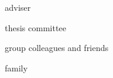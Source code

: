 \acknowledgments

adviser 

thesis committee

group colleagues and friends

family 

\endacknowledgments
